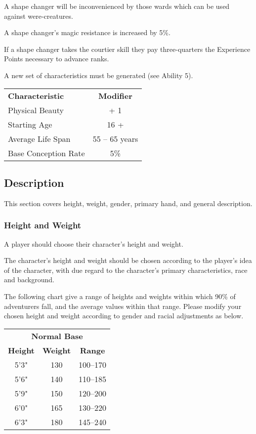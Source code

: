 \begin{multicols*}{3}
\begin{Enumerate}
\item
A shape changer will be inconvenienced by those wards which can be
used against were-creatures.

\item
A shape changer's magic resistance is increased by 5\%.

\item
If a shape changer takes the courtier skill they pay three-quarters
the Experience Points necessary to advance ranks.
\end{Enumerate}

A new set of characteristics must be generated (see Ability 5).

\begin{tabularx}{\linewidth}{Xc}
\textbf{Characteristic} & \textbf{Modifier} \\
Physical Beauty		& + 1 \\
Starting Age		& 16 + \\
Average Life Span	& 55 -- 65 years \\
Base Conception Rate	& 5\% \\
\end{tabularx}

\subsection{Description}

This section covers height, weight, gender, primary hand, and general
description.

\subsubsection{Height and Weight}

A player should choose their character's height and weight.

The character's height and weight should be chosen according to the
player's idea of the character, with due regard to the character's
primary characteristics, race and background.

The following chart give a range of heights and weights within which
90\% of adventurers fall, and the average values within that
range. Please modify your chosen height and weight according to gender
and racial adjustments as below.

\begin{tabular}{ccc}
\multicolumn{3}{c}{\textbf{Normal Base}} \\
\textbf{Height} & \textbf{Weight} & \textbf{Range} \\
5'3"	& 130	& 100--170 \\
5'6"	& 140	& 110--185 \\
5'9"	& 150	& 120--200 \\
6'0"	& 165	& 130--220 \\
6'3"	& 180	& 145--240 \\
\end{tabular}


\end{multicols*}
